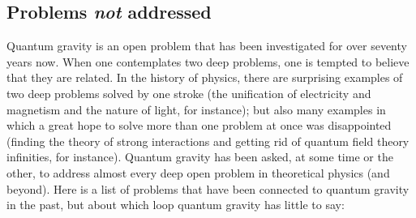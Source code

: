\subsection{Problems {\em not\/} addressed}

Quantum gravity is an open problem that has been investigated for 
over seventy years now.  When one contemplates two deep problems, 
one is tempted to believe that they are related.  In the history 
of physics, there are surprising examples of two deep problems 
solved by one stroke (the unification of electricity and 
magnetism and the nature of light, for instance); but also many 
examples in which a great hope to solve more than one problem at 
once was disappointed (finding the theory of strong interactions 
and getting rid of quantum field theory infinities, for 
instance).  Quantum gravity has been asked, at some time or the 
other, to address almost every deep open problem in theoretical 
physics (and beyond).  Here is a list of problems that have been 
connected to quantum gravity in the past, but about which loop 
quantum gravity has little to say:

